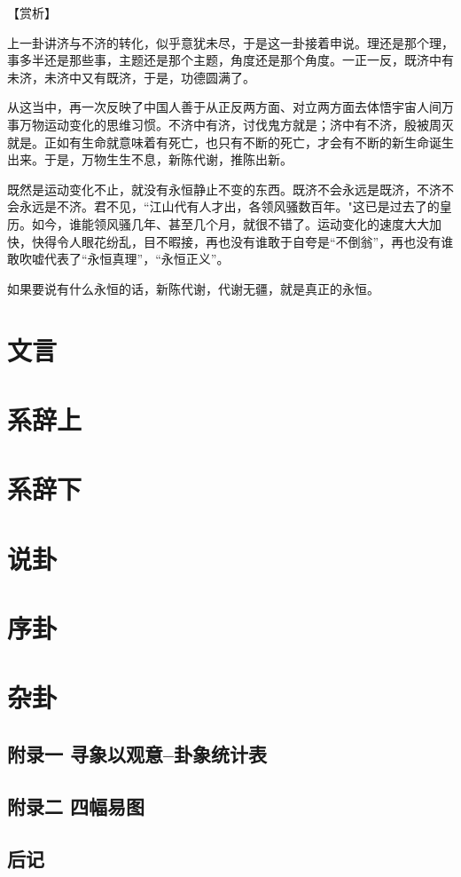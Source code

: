 \documentclass[12pt,UTF8]{ctexbook}
\begin{document}
【赏析】

上一卦讲济与不济的转化，似乎意犹未尽，于是这一卦接着申说。理还是那个理，事多半还是那些事，主题还是那个主题，角度还是那个角度。一正一反，既济中有未济，未济中又有既济，于是，功德圆满了。

从这当中，再一次反映了中国人善于从正反两方面、对立两方面去体悟宇宙人间万事万物运动变化的思维习惯。不济中有济，讨伐鬼方就是；济中有不济，殷被周灭就是。正如有生命就意味着有死亡，也只有不断的死亡，才会有不断的新生命诞生出来。于是，万物生生不息，新陈代谢，推陈出新。

既然是运动变化不止，就没有永恒静止不变的东西。既济不会永远是既济，不济不会永远是不济。君不见，“江山代有人才出，各领风骚数百年。"这已是过去了的皇历。如今，谁能领风骚几年、甚至几个月，就很不错了。运动变化的速度大大加快，快得令人眼花纷乱，目不暇接，再也没有谁敢于自夸是“不倒翁”，再也没有谁敢吹嘘代表了“永恒真理”，“永恒正义”。

如果要说有什么永恒的话，新陈代谢，代谢无疆，就是真正的永恒。

\part{文言}
\part{系辞上}
\part{系辞下}
\part{说卦}
\part{序卦}
\part{杂卦}

\backmatter
\chapter{附录一 寻象以观意--卦象统计表}
\chapter{附录二 四幅易图}
\chapter{后记}
\end{document}
